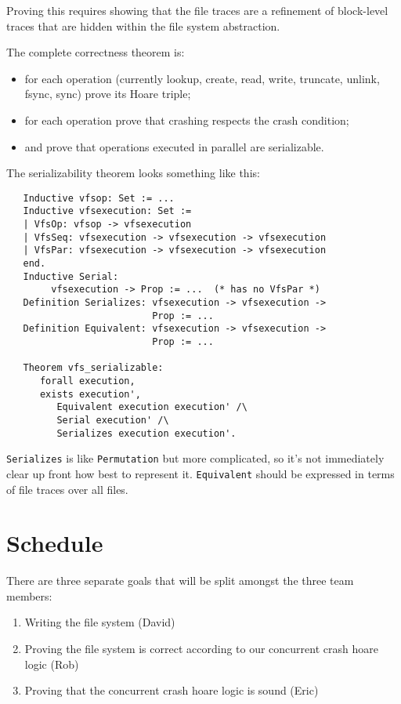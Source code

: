 \documentclass[11pt, twocolumn, letterpaper]{article}
\begin{document}
Proving this requires showing that the file traces are a refinement of
block-level traces that are hidden within the file system abstraction.

The complete correctness theorem is:
\begin{itemize}
\item for each operation (currently lookup, create, read, write,
truncate, unlink, fsync, sync) prove its Hoare triple;
\item for each operation prove that crashing respects the crash
condition;
\item and prove that operations executed in parallel are serializable.
\end{itemize}

The serializability theorem looks something like this:
{\tiny
\begin{verbatim}
   Inductive vfsop: Set := ...
   Inductive vfsexecution: Set :=
   | VfsOp: vfsop -> vfsexecution
   | VfsSeq: vfsexecution -> vfsexecution -> vfsexecution
   | VfsPar: vfsexecution -> vfsexecution -> vfsexecution
   end.
   Inductive Serial:
        vfsexecution -> Prop := ...  (* has no VfsPar *)
   Definition Serializes: vfsexecution -> vfsexecution ->
                          Prop := ...
   Definition Equivalent: vfsexecution -> vfsexecution ->
                          Prop := ...

   Theorem vfs_serializable:
      forall execution,
      exists execution',
         Equivalent execution execution' /\
         Serial execution' /\
         Serializes execution execution'.
\end{verbatim}
}

\texttt{Serializes} is like \texttt{Permutation} but more complicated,
so it's not immediately clear up front how best to represent it.
\texttt{Equivalent} should be expressed in terms of file traces over
all files.

\section{Schedule}

%

There are three separate goals that will be split amongst the three team
members:

\begin{enumerate}
    \item Writing the file system (David)

    \item Proving the file system is correct according to our concurrent crash hoare
logic (Rob)

    \item Proving that the concurrent crash hoare logic is sound (Eric)
\end{enumerate}
\end{document}

